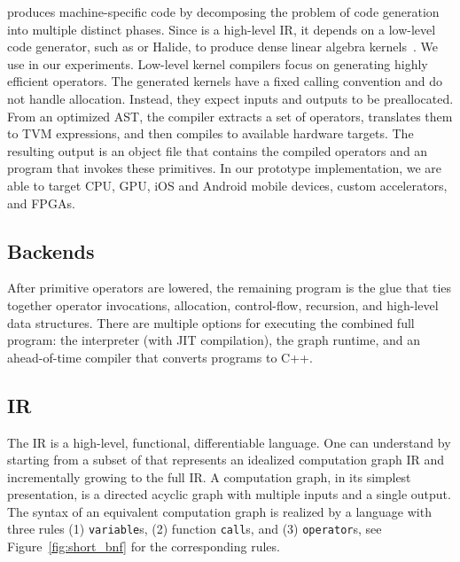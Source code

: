   \relay produces machine-specific code
    by decomposing the problem of code generation into multiple distinct phases.
  Since \relay is a high-level IR, it depends on a low-level code generator,
    such as \tvm or Halide,
    to produce dense linear algebra kernels~\cite{tvm_osdi18, halide}.
  We use \tvm in our experiments.
  Low-level kernel compilers focus on generating highly efficient operators.
  The generated kernels have a fixed calling convention and do not
    handle allocation. Instead, they expect inputs and outputs to be preallocated.
  From an optimized AST,
    the compiler extracts a set of \relay operators,
    translates them to TVM expressions,
    and then compiles to available hardware targets.
  The resulting output is an
    object file that contains the compiled operators
    and an \relay program that invokes these primitives.
  In our prototype implementation,
    we are able to target CPU, GPU,
    iOS and Android mobile devices,
    custom accelerators, and FPGAs.

  \subsection{Backends}
  After primitive operators are lowered,
    the remaining \relay program is the glue that ties
    together operator invocations, allocation, control-flow,
    recursion, and high-level data structures.
  There are multiple options for executing the combined full program:
      the \relay interpreter (with JIT compilation),
      the \tvm graph runtime,
      and an ahead-of-time compiler
      that converts programs to C++.

  \subsection{IR}
  

  The \relay IR is a high-level, functional, differentiable language.
  One can understand \relay by starting from a subset of \relay
    that represents an idealized computation graph IR and
    incrementally growing to the full \relay IR.
  A computation graph, in its simplest presentation, is a directed acyclic
    graph with multiple inputs and a single output.
  The syntax of an equivalent computation graph is realized by
    a language with three rules (1) \verb|variable|s, (2) function \verb|call|s,
    and (3) \verb|operator|s, see Figure~\ref{fig:short_bnf} for the corresponding rules.

